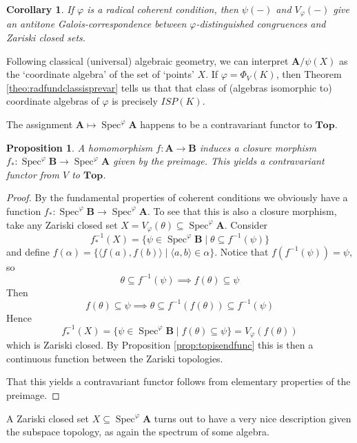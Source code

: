 \documentclass{article}
\theoremstyle{plain}
\newtheorem{corollary}[theorem]{Corollary}
\newtheorem{proposition}[theorem]{Proposition}
\theoremstyle{definition}
\newcommand{\Spec}{\operatorname{Spec}}
\begin{document}
\begin{corollary}
    If $\varphi$ is a radical coherent condition, then $\psi(-)$ and $V_\varphi(-)$ give an antitone Galois-correspondence between $\varphi$-distinguished congruences and Zariski closed sets.
\end{corollary}


Following classical (universal) algebraic geometry, we can interpret $\mathbf{A}/\psi(X)$ as the `coordinate algebra' of the set of `points' $X$.
If $\varphi = \Phi_V(K)$, then Theorem \ref{theo:radfundclassisprevar} tells us that that class of (algebras isomorphic to) coordinate algebras of $\varphi$ is precisely $ISP(K)$.\par
The assignment $\mathbf{A} \mapsto \Spec^\varphi\mathbf{A}$ happens to be a contravariant functor to $\mathbf{Top}$.

\begin{proposition}
    A homomorphism $f \colon \mathbf{A} \rightarrow \mathbf{B}$ induces a closure morphism $f_\ast \colon \Spec^\varphi\mathbf{B} \rightarrow\Spec^\varphi\mathbf{A}$ given by the preimage.
    This yields a contravariant functor from $V$ to $\mathbf{Top}$.
\end{proposition}
\begin{proof}
    By the fundamental properties of coherent conditions we obviously have a function $f_\ast \colon \Spec^\varphi\mathbf{B} \rightarrow\Spec^\varphi\mathbf{A}$.
    To see that this is also a closure morphism, take any Zariski closed set $X = V_\varphi(\theta) \subseteq \Spec^\varphi\mathbf{A}$.
    Consider 
    $$f^{-1}_\ast(X) = \{ \psi \in \Spec^\varphi\mathbf{B} \mid \theta \subseteq f^{-1}(\psi) \}$$
    and define $f(\alpha) = \{ \langle f(a), f(b)\rangle \mid\langle a, b\rangle \in \alpha \}$.
    Notice that $f(f^{-1}(\psi)) = \psi$, so
    $$\theta  \subseteq f^{-1}(\psi) \implies f(\theta) \subseteq \psi$$
    Then
    $$f(\theta) \subseteq \psi \implies \theta \subseteq f^{-1}(f(\theta)) \subseteq f^{-1}(\psi)$$
    Hence 
    $$f^{-1}_\ast(X) =\{ \psi \in \Spec^\varphi\mathbf{B} \mid f(\theta) \subseteq \psi \} = V_\varphi(f(\theta))$$
    which is Zariski closed.
    By Proposition \ref{prop:topisendfunc} this is then a continuous function between the Zariski topologies.\par
    That this yields a contravariant functor follows from elementary properties of the preimage.
\end{proof}

A Zariski closed set $X \subseteq \Spec^\varphi\mathbf{A}$ turns out to have a very nice description given the subspace topology, as again the spectrum of some algebra.
\end{document}

